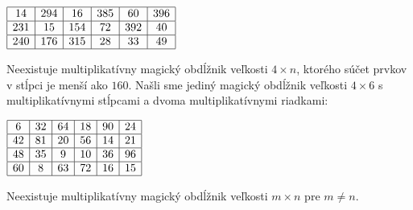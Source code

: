 \begin{center}
$\begin{array}{ |c|c|c|c|c|c| } 
\hline
14 & 294 & 16 & 385 & 60 & 396 \\ 
\hline
231 & 15 & 154 & 72 & 392 & 40 \\ 
\hline
240 & 176 & 315 & 28 & 33 & 49 \\ 
\hline
\end{array}$
\end{center}

\begin{result} Neexistuje multiplikatívny magický obdĺžnik veľkosti $4 \times n$, ktorého súčet prvkov v stĺpci je menší ako $160$. Našli sme jediný magický obdĺžnik veľkosti $4 \times 6$ s multiplikatívnymi stĺpcami a dvoma multiplikatívnymi riadkami:
\end{result}

\begin{center}
$\begin{array}{ |c|c|c|c|c|c| } 
\hline
6 & 32 & 64 & 18 & 90 & 24 \\ 
\hline
42 & 81 & 20 & 56 & 14 & 21 \\ 
\hline
48 & 35 & 9 & 10 & 36 & 96 \\ 
\hline
60 & 8 & 63 & 72 & 16 & 15 \\ 
\hline
\end{array}$
\end{center}

\begin{hypothesis} Neexistuje multiplikatívny magický obdĺžnik veľkosti $m \times n$ pre $m \neq n$.
\end{hypothesis}

